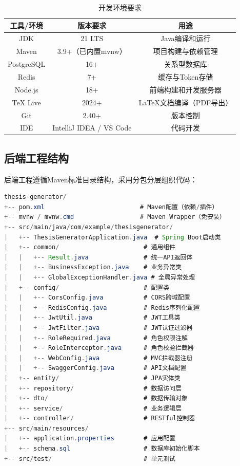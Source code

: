 \documentclass{../../softeng}
\begin{document}
\begin{table}[htbp]
    \centering
    \caption{开发环境要求}
    \begin{tabular}{|c|c|c|}
        \hline
        \textbf{工具/环境} & \textbf{版本要求} & \textbf{用途} \\
        \hline
        JDK & 21 LTS & Java编译和运行 \\
        \hline
        Maven & 3.9+（已内置mvnw） & 项目构建与依赖管理 \\
        \hline
        PostgreSQL & 16+ & 关系型数据库 \\
        \hline
        Redis & 7+ & 缓存与Token存储 \\
        \hline
        Node.js & 18+ & 前端构建和开发服务器 \\
        \hline
        TeX Live & 2024+ & LaTeX文档编译（PDF导出） \\
        \hline
        Git & 2.40+ & 版本控制 \\
        \hline
        IDE & IntelliJ IDEA / VS Code & 代码开发 \\
        \hline
    \end{tabular}
\end{table}

\subsection{后端工程结构}

后端工程遵循Maven标准目录结构，采用分包分层组织代码：

\begin{lstlisting}[language=Java,caption={后端工程目录结构}]
thesis-generator/
+-- pom.xml                          # Maven配置（依赖/插件）
+-- mvnw / mvnw.cmd                  # Maven Wrapper（免安装）
+-- src/main/java/com/example/thesisgenerator/
|   +-- ThesisGeneratorApplication.java  # Spring Boot启动类
|   +-- common/                       # 通用组件
|   |   +-- Result.java               # 统一API返回体
|   |   +-- BusinessException.java    # 业务异常类
|   |   +-- GlobalExceptionHandler.java # 全局异常处理
|   +-- config/                       # 配置类
|   |   +-- CorsConfig.java           # CORS跨域配置
|   |   +-- RedisConfig.java          # Redis序列化配置
|   |   +-- JwtUtil.java              # JWT工具类
|   |   +-- JwtFilter.java            # JWT认证过滤器
|   |   +-- RoleRequired.java         # 角色权限注解
|   |   +-- RoleInterceptor.java      # 角色校验拦截器
|   |   +-- WebConfig.java            # MVC拦截器注册
|   |   +-- SwaggerConfig.java        # API文档配置
|   +-- entity/                       # JPA实体类
|   +-- repository/                   # 数据访问层
|   +-- dto/                          # 数据传输对象
|   +-- service/                      # 业务逻辑层
|   +-- controller/                   # RESTful控制器
+-- src/main/resources/
|   +-- application.properties        # 应用配置
|   +-- schema.sql                    # 数据库初始化脚本
+-- src/test/                         # 单元测试
\end{lstlisting}
\end{document}

